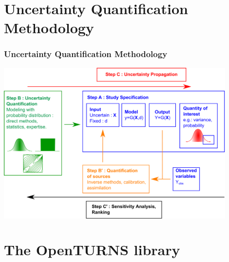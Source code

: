 \documentclass{beamer}
\begin{document}
\section{Uncertainty Quantification Methodology}


\begin{frame}
\frametitle{Uncertainty Quantification Methodology}

\begin{center}
\includegraphics[width=0.9\textwidth]{figures/MethodologieIncertitude-EN}
\end{center}

\end{frame}


\section{The OpenTURNS library}

\end{document}
